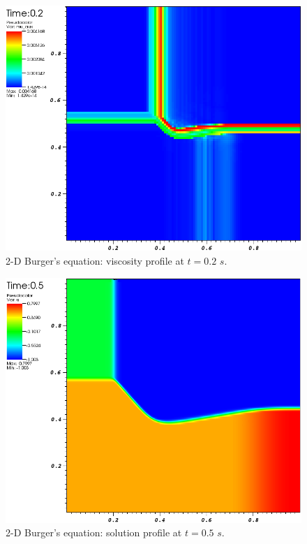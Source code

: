%
\begin{figure}[H]
	\centering
	\includegraphics[width=\textwidth]{figures/Burger2D_visc_t0p2.png}
	\caption{2-D Burger's equation: viscosity profile at $t=0.2$ $s$.}
	\label{fig:2d_burger_visc_t0p2}
\end{figure}
%
\begin{figure}[H]
	\centering
	\includegraphics[width=\textwidth]{figures/Burger2D_sol_t0p5.png}
	\caption{2-D Burger's equation: solution profile at $t=0.5$ $s$.}
	\label{fig:2d_burger_sol_t0p5}
\end{figure}
